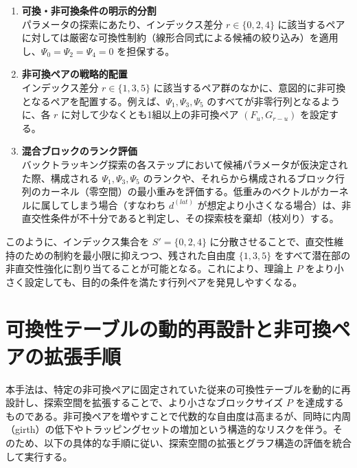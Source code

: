 \documentclass[a4paper,11pt,dvipdfmx]{jsarticle}
\theoremstyle{definition}
\begin{document}
\begin{enumerate}
    \item \textbf{可換・非可換条件の明示的分割}\\
    パラメータの探索にあたり、インデックス差分 $r \in \{0, 2, 4\}$ に該当するペアに対しては厳密な可換性制約（線形合同式による候補の絞り込み）を適用し、$\Psi_0 = \Psi_2 = \Psi_4 = 0$ を担保する。
    
    \item \textbf{非可換ペアの戦略的配置}\\
    インデックス差分 $r \in \{1, 3, 5\}$ に該当するペア群のなかに、意図的に非可換となるペアを配置する。例えば、$\Psi_1, \Psi_3, \Psi_5$ のすべてが非零行列となるように、各 $r$ に対して少なくとも1組以上の非可換ペア $(F_u, G_{r-u})$ を設定する。
    
    \item \textbf{混合ブロックのランク評価}\\
    バックトラッキング探索の各ステップにおいて候補パラメータが仮決定された際、構成される $\Psi_1, \Psi_3, \Psi_5$ のランクや、それらから構成されるブロック行列のカーネル（零空間）の最小重みを評価する。低重みのベクトルがカーネルに属してしまう場合（すなわち $d^{(lat)}$ が想定より小さくなる場合）は、非直交性条件が不十分であると判定し、その探索枝を棄却（枝刈り）する。
\end{enumerate}

このように、インデックス集合を $S'=\{0, 2, 4\}$ に分散させることで、直交性維持のための制約を最小限に抑えつつ、残された自由度 $\{1, 3, 5\}$ をすべて潜在部の非直交性強化に割り当てることが可能となる。これにより、理論上 $P$ をより小さく設定しても、目的の条件を満たす行列ペアを発見しやすくなる。

\section{可換性テーブルの動的再設計と非可換ペアの拡張手順}

本手法は、特定の非可換ペアに固定されていた従来の可換性テーブルを動的に再設計し、探索空間を拡張することで、より小さなブロックサイズ $P$ を達成するものである。非可換ペアを増やすことで代数的な自由度は高まるが、同時に内周（girth）の低下やトラッピングセットの増加という構造的なリスクを伴う。そのため、以下の具体的な手順に従い、探索空間の拡張とグラフ構造の評価を統合して実行する。
\end{document}
